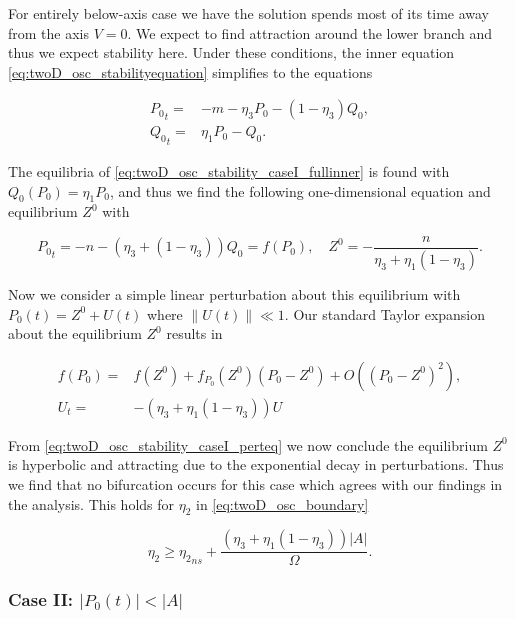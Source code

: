 For entirely below-axis case we have the solution spends most of its time away from the axis $V=0$. We expect to find attraction around the lower branch and thus we expect stability here. Under these conditions, the inner equation \eqref{eq:twoD_osc_stabilityequation} simplifies to the equations

\begin{equation}\label{eq:twoD_osc_stability_caseI_fullinner}
\begin{aligned}
{P_0}_t =& -m -\eta_3 P_0-(1-\eta_3)Q_0,\\
{Q_0}_t =& \eta_1 P_0 - Q_0.
\end{aligned}
\end{equation}

The equilibria of \eqref{eq:twoD_osc_stability_caseI_fullinner} is found with $Q_0(P_0)=\eta_1 P_0$, and thus we find the following one-dimensional equation and equilibrium $Z^0$ with

\begin{equation}\label{eq:twoD_osc_stability_caseI_red}
{P_0}_t = -n -(\eta_3 +(1-\eta_3))Q_0=f(P_0),\quad Z^0 = -\frac{n}{\eta_3+\eta_1(1-\eta_3)}.
\end{equation}

Now we consider a simple linear perturbation about this equilibrium with $P_0(t)= Z^0+U(t)$ where $\lVert U(t) \rVert \ll 1$. Our standard Taylor expansion about the equilibrium $Z^0$ results in

\begin{equation}\label{eq:twoD_osc_stability_caseI_perteq}
\begin{aligned}
f(P_0)=&f(Z^0)+f_{P_0}(Z^0)(P_0-Z^0)+O((P_0-Z^0)^2),\\
U_t =& -(\eta_3+\eta_1(1-\eta_3))U
\end{aligned}
\end{equation}

From \eqref{eq:twoD_osc_stability_caseI_perteq} we now conclude the equilibrium $Z^0$ is hyperbolic and attracting due to the exponential decay in perturbations. Thus we find that no bifurcation occurs for this case which agrees with our findings in the analysis. This holds for $\eta_2$ in \eqref{eq:twoD_osc_boundary}

\begin{equation*}
\eta_2 \ge {\eta_2}_{ns} +\frac{(\eta_3+\eta_1(1-\eta_3))|A|}{\Omega}.
\end{equation*}


\subsubsection{Case II: $|P_0(t)|<|A|$}

